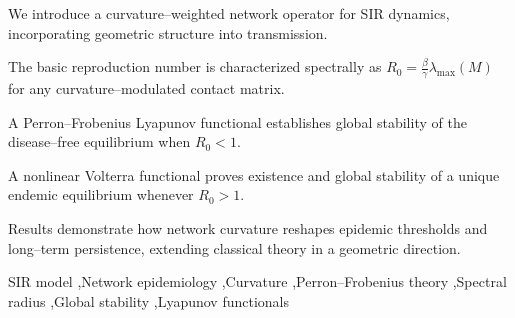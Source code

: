 \documentclass[final,3p,times,twocolumn]{elsarticle}
\begin{document}
\begin{frontmatter}
\begin{abstract}
We propose a new network-based SIR epidemic model in which transmission is modulated by a curvature-weighted contact matrix that encodes structural and geometric features of the underlying graph. The formulation encompasses both adjacency-driven and Markovian mixing, allowing heterogeneous interactions to be shaped by curvature-sensitive topological properties. We prove that the basic reproduction number satisfies
\[
R_0=\frac{\beta}{\gamma}\lambda_{\max}(M),
\]
where $M$ is the curvature-weighted transmission operator. Using Perron--Frobenius theory together with linear and nonlinear Lyapunov functionals, we establish: (i) global asymptotic stability of the disease-free equilibrium when $R_0<1$, and (ii) existence and global asymptotic stability of a unique endemic equilibrium when $R_0>1$. Our results show that curvature acts as a geometric regularizer of connectivity, lowering spectral radii, raising effective epidemic thresholds, and organizing the long-term dynamics through monotone contraction toward the endemic state. This framework generalizes classical network epidemiology by integrating geometric information directly into transmission operators, providing a rigorous foundation for epidemic dynamics on structurally heterogeneous networks.

\end{abstract}

\begin{graphicalabstract}
\end{graphicalabstract}

\begin{highlights}
\item We introduce a curvature–weighted network operator for SIR dynamics, incorporating geometric structure into transmission.
\item The basic reproduction number is characterized spectrally as $R_0=\frac{\beta}{\gamma}\lambda_{\max}(M)$ for any curvature–modulated contact matrix.
\item A Perron–Frobenius Lyapunov functional establishes global stability of the disease–free equilibrium when $R_0<1$.
\item A nonlinear Volterra functional proves existence and global stability of a unique endemic equilibrium whenever $R_0>1$.
\item Results demonstrate how network curvature reshapes epidemic thresholds and long–term persistence, extending classical theory in a geometric direction.
\end{highlights}



\begin{keyword}
SIR model \sep Network epidemiology \sep Curvature \sep Perron--Frobenius theory \sep Spectral radius \sep Global stability \sep Lyapunov functionals
\end{keyword}


\end{frontmatter}
\end{document}
